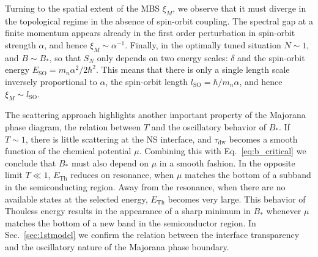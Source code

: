 Turning to the spatial extent of the MBS $\xi_M$, we observe that it must diverge in the topological regime in the absence of spin-orbit coupling.
The spectral gap at a finite momentum appears already in the first order perturbation in spin-orbit strength $\alpha$, and hence $\xi_M \sim \alpha^{-1}$.
Finally, in the optimally tuned situation $N\sim 1$, and $B \sim B_*$, so that $S_N$ only depends on two energy scales: $\delta$ and the spin-orbit energy $E_\textrm{SO} = m_n \alpha^2/2\hbar^2$.
This means that there is only a single length scale inversely proportional to $\alpha$, the spin-orbit length $l_\textrm{SO} = \hbar/m_n\alpha$, and hence $\xi_M\sim l_\textrm{SO}$.

The scattering approach highlights another important property of the Majorana phase diagram, the relation between $T$ and the oscillatory behavior of $B_*$.
If $T\sim 1$, there is little scattering at the NS interface, and $\tau_\textrm{dw}$ becomes a smooth function of the chemical potential $\mu$.
Combining this with Eq.~\eqref{eq:b_critical} we conclude that $B_*$ must also depend on $\mu$ in a smooth fashion.
In the opposite limit $T\ll 1$, $E_\textrm{Th}$ reduces on resonance, when $\mu$ matches the bottom of a subband in the semiconducting region.
Away from the resonance, when there are no available states at the selected energy, $E_\textrm{Th}$ becomes very large.
This behavior of Thouless energy results in the appearance of a sharp minimum in $B_*$ whenever $\mu$ matches the bottom of a new band in the semiconductor region.
In Sec.~\ref{sec:1stmodel} we confirm the relation between the interface transparency and the oscillatory nature of the Majorana phase boundary.

